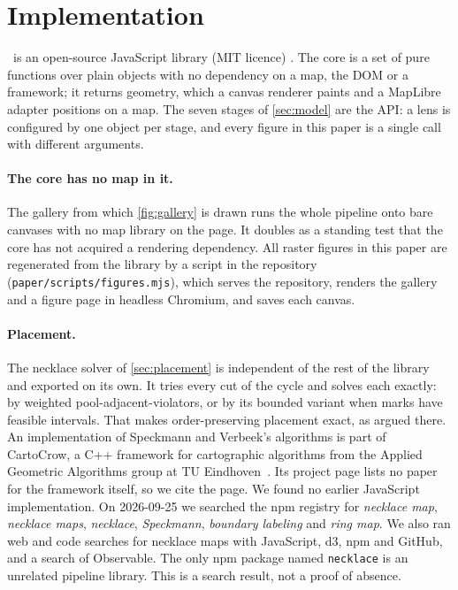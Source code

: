 \section{Implementation}
\label{sec:implementation}

\sys\ is an open-source JavaScript library (MIT licence)
. The core is a set of
pure functions over plain objects with no dependency on a map, the DOM or a
framework; it returns geometry, which a canvas renderer paints and a MapLibre
adapter positions on a map. The seven stages of \cref{sec:model} are the API:
a lens is configured by one object per stage, and every figure in this paper is
a single call with different arguments.

\paragraph{The core has no map in it.} The gallery from which
\cref{fig:gallery} is drawn runs the whole pipeline onto bare canvases with no
map library on the page. It doubles as a standing test that the core has not
acquired a rendering dependency. All raster figures in this paper are
regenerated from the library by a script in the repository
(\texttt{paper/scripts/figures.mjs}), which serves the repository, renders the
gallery and a figure page in headless Chromium, and saves each canvas.

\paragraph{Placement.} The necklace solver of \cref{sec:placement} is
independent of the rest of the library and exported on its own. It tries every
cut of the cycle and solves each exactly: by weighted pool-adjacent-violators,
or by its bounded variant when marks have feasible intervals. That makes
order-preserving placement exact, as argued there. An implementation of Speckmann and
Verbeek's algorithms is part of CartoCrow, a C++ framework for cartographic
algorithms from the Applied Geometric Algorithms group at TU
Eindhoven~\cite{cartocrow}. Its project page lists no paper for the framework
itself, so we cite the page. We found no earlier JavaScript implementation. On
2026-09-25 we searched the npm registry for \emph{necklace map},
\emph{necklace maps}, \emph{necklace}, \emph{Speckmann}, \emph{boundary
labeling} and \emph{ring map}. We also ran web and code searches for necklace
maps with JavaScript, d3, npm and GitHub, and a search of Observable. The
only npm package named \texttt{necklace} is an unrelated pipeline library.
This is a search result, not a proof of absence.

